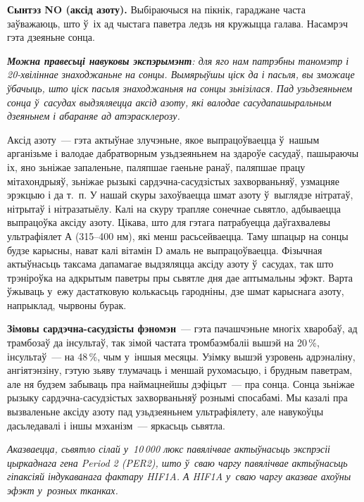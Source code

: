 \textbf{Сынтэз NO (аксід азоту).} Выбіраючыся на пікнік, гараджане часта заўважаюць, што ў~іх ад чыстага паветра ледзь ня кружыцца галава. Насамрэч гэта дзеяньне сонца.

\emph{\textbf{Можна правесьці навуковы экспэрымэнт}: для яго нам патрэбны таномэтр і 20-хвіліннае знаходжаньне на сонцы. Вымярыўшы ціск да і пасьля, вы зможаце ўбачыць, што ціск пасьля знаходжаньня на сонцы зьнізілася. Пад узьдзеяньнем сонца ў~сасудах выдзяляецца аксід азоту, які валодае сасудапашыральным дзеяньнем і абараняе ад атэрасклерозу.}

Аксід азоту~--- гэта актыўнае злучэньне, якое выпрацоўваецца ў~нашым арганізьме і валодае дабратворным узьдзеяньнем на здароўе сасудаў, пашыраючы іх, яно зьніжае запаленьне, паляпшае гаеньне ранаў, паляпшае працу мітахондрыяў, зьніжае рызыкі сардэчна-сасудзістых захворваньняў, узмацняе эрэкцыю і да т.~п. У нашай скуры захоўваецца шмат азоту ў~выглядзе нітратаў, нітрытаў і нітразатыёлу. Калі на скуру трапляе сонечнае сьвятло, адбываецца выпрацоўка аксіду азоту. Цікава, што для гэтага патрабуецца даўгахвалевы ультрафіялет А (315--400 нм), які менш расьсейваецца. Таму шпацыр на сонцы будзе карысны, нават калі вітамін D амаль не выпрацоўваецца. Фізычная актыўнасьць таксама дапамагае выдзяляцца аксіду азоту ў~сасудах, так што трэніроўка на адкрытым паветры пры сьвятле дня дае аптымальны эфэкт. Варта ўжываць у~ежу дастатковую колькасьць гародніны, дзе шмат карыснага азоту, напрыклад, чырвоны бурак.

\textbf{Зімовы сардэчна-сасудзісты фэномэн}~--- гэта пачашчэньне многіх хваробаў, ад трамбозаў да інсультаў, так зімой частата тромбаэмбаліі вышэй на 20\,\%, інсультаў~--- на 48\,\%, чым у~іншыя месяцы. Узімку вышэй узровень адрэналіну, ангіятэнзіну, гэтую зьяву тлумачаць і меншай рухомасьцю, і брудным паветрам, але ня будзем забываць пра наймацнейшы дэфіцыт~--- пра сонца. Сонца зьніжае рызыку сардэчна-сасудзістых захворваньняў рознымі спосабамі. Мы казалі пра вызваленьне аксіду азоту пад узьдзеяньнем ультрафіялету, але навукоўцы дасьледавалі і іншы мэханізм~--- яркасьць сьвятла.

\emph{Аказваецца, сьвятло сілай у~10\,000 люкс павялічвае актыўнасьць экспрэсіі цыркаднага гена Period 2 (PER2), што ў~сваю чаргу павялічвае актыўнасьць гіпаксіяй індукаванага фактару HIF1A. А HIF1A у~сваю чаргу аказвае ахоўны эфэкт у~розных тканках.}


